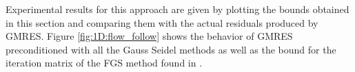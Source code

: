 Experimental results for this approach are given by plotting the bounds
obtained in this section and comparing them with the actual residuals produced
by GMRES. Figure \ref{fig:1D:flow_follow} shows the behavior of GMRES
preconditioned with all the Gauss Seidel methods as well as the bound for the
iteration matrix of the FGS method found in \cite[Theorem~5.4]{ElmChe93}.
%
